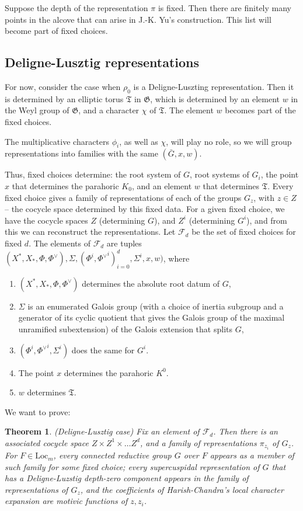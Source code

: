 \documentclass[12pt]{amsart}
\newcommand{\cF}{\mathcal{F}}
\newcommand{\Loc}{\mathrm{Loc}}
\def\cF{\mathcal{F}}
\newcommand{\fG}{\mathfrak G}
\newcommand{\fT}{\mathfrak T}
\theoremstyle{plain}
\newtheorem{theorem}[thm]{Theorem}
\theoremstyle{definition}
\begin{document}
Suppose the depth of the representation $\pi$ is fixed. Then there are finitely many points in the alcove that can arise in J.-K. Yu's construction. This list will become part of fixed choices. 


  
\subsection{Deligne-Lusztig representations} 
For now, consider the case when $\rho_0$ is a Deligne-Luszting representation. 
Then it is determined by an elliptic torus $\fT$ in $\fG$, which is determined by an element $w$ in the Weyl group of $\fG$, and a character $\chi$ of $\fT$.  
The element $w$ becomes  part of the fixed choices.
  
The multiplicative characters $\phi_i$, as well as $\chi$, will play no role, so we will group 
representations into families with the same $(\bar G, x, w)$. 

Thus, fixed choices determine: the root system of $G$, root systems of $G_i$, 
the point $x$ that determines the parahoric $K_0$, and an element $w$ that determines 
$\fT$.  
Every fixed choice gives a family of representations of each of the groups $G_z$, with $z\in Z$ -- the cocycle space determined by this fixed data.
For a given fixed choice, we have the cocycle spaces $Z$ (determining $G$), and $Z^i$ (determining $G^i$), and from this we can reconstruct the representations. 
Let $\cF_d$ be the set of fixed choices for fixed $d$.
The elements of $\cF_d$ are tuples 
$(X^\ast, X_\ast, \Phi, \Phi^\vee), \Sigma, (\Phi^i, {\Phi^\vee}^i)_{i=0}^d, \Sigma^i, x, w)$, where 
\begin{enumerate}
\item  $(X^\ast, X_\ast, \Phi, \Phi^\vee)$  determines the absolute root datum of $G$, 
\item $\Sigma$ is an enumerated Galois group (with a choice of inertia subgroup and a 
generator of its cyclic quotient that gives the Galois group of the maximal unramified 
subextension) of the Galois extension that splits $G$,
\item  $(\Phi^i, {\Phi^\vee}^i, \Sigma^i)$ does the same for $G^i$. 
\item  The point $x$  determines the parahoric $K^0$.   
\item $w$ determines  $\fT$. 
\end{enumerate}

We want to prove: 
\begin{theorem} (Deligne-Lusztig case) Fix an element of $\cF_d$. 
Then there is an associated cocycle space $Z\times Z^1\times \dots Z^d$, and a family of representations $\pi_{z_i}$ of $G_z$. 
For $F\in \Loc_m$, every connected reductive group $G$ over $F$ appears as a member  of such  family for some fixed choice; 
every supercuspidal representation of $G$ that has a Deligne-Luzstig depth-zero component 
appears in the family of representations of $G_z$, and 
the coefficients of Harish-Chandra's local character expansion are motivic functions of 
$z, z_i$. 
\end{theorem}
\end{document}
